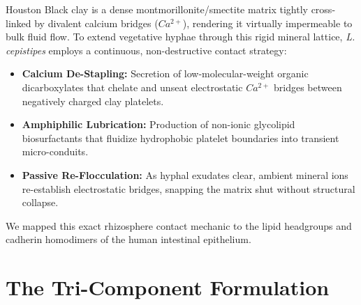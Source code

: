\documentclass[10pt,twocolumn,letterpaper]{article}
\begin{document}
Houston Black clay is a dense montmorillonite/smectite matrix tightly cross-linked by divalent calcium bridges ($Ca^{2+}$), rendering it virtually impermeable to bulk fluid flow. To extend vegetative hyphae through this rigid mineral lattice, \textit{L. cepistipes} employs a continuous, non-destructive contact strategy:
\begin{itemize}[noitemsep]
    \item \textbf{Calcium De-Stapling:} Secretion of low-molecular-weight organic dicarboxylates that chelate and unseat electrostatic $Ca^{2+}$ bridges between negatively charged clay platelets.
    \item \textbf{Amphiphilic Lubrication:} Production of non-ionic glycolipid biosurfactants that fluidize hydrophobic platelet boundaries into transient micro-conduits.
    \item \textbf{Passive Re-Flocculation:} As hyphal exudates clear, ambient mineral ions re-establish electrostatic bridges, snapping the matrix shut without structural collapse.
\end{itemize}

We mapped this exact rhizosphere contact mechanic to the lipid headgroups and cadherin homodimers of the human intestinal epithelium.

\section{The Tri-Component Formulation}
\end{document}
